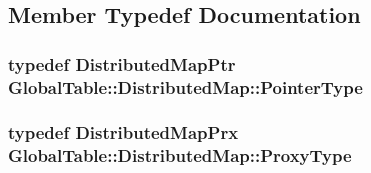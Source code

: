 \subsection{Member Typedef Documentation}
\hypertarget{class_global_table_1_1_distributed_map_a72fa66c995c2be63800ed403c30b64ad}{
\subsubsection[{PointerType}]{\setlength{\rightskip}{0pt plus 5cm}typedef {\bf DistributedMapPtr} {\bf GlobalTable::DistributedMap::PointerType}}}
\label{class_global_table_1_1_distributed_map_a72fa66c995c2be63800ed403c30b64ad}
\hypertarget{class_global_table_1_1_distributed_map_a9c12eff07798c7a775fc2f2e91d7f240}{
\subsubsection[{ProxyType}]{\setlength{\rightskip}{0pt plus 5cm}typedef {\bf DistributedMapPrx} {\bf GlobalTable::DistributedMap::ProxyType}}}
\label{class_global_table_1_1_distributed_map_a9c12eff07798c7a775fc2f2e91d7f240}


